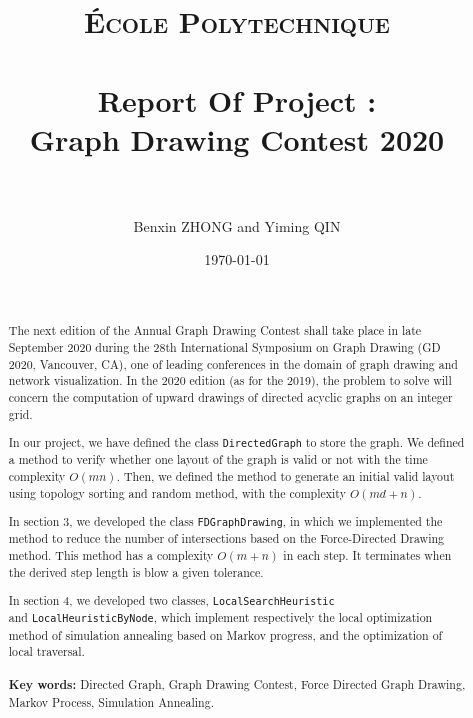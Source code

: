 \documentclass[paper=a4, fontsize=12pt, french]{scrartcl} %
\title{	
\normalfont \normalsize 
\textsc{École Polytechnique} \\ [25pt] %
\horrule{0.5pt} \\[0.4cm] %
\huge  Report Of Project : \\
\huge  Graph Drawing Contest 2020\\ %
\horrule{2pt} \\[0.5cm] %
}
\author{Benxin ZHONG and Yiming QIN} %
\date{\normalsize\today} %
\numberwithin{equation}{section} %
\numberwithin{figure}{section} %
\numberwithin{table}{section} %
\begin{document}
\maketitle %
\thispagestyle{empty}

\newpage
\begin{abstract}
\thispagestyle{empty}
{ }
\\
\newline


The next edition of the Annual Graph Drawing Contest shall take place in late September 2020 during the 28th International Symposium on Graph Drawing (GD 2020, Vancouver, CA), one of leading conferences in the domain of graph drawing and network visualization.
In the 2020 edition (as for the 2019), the problem to solve will concern the computation of upward drawings of directed acyclic graphs on an integer grid.

In our project, we have defined the class \lstinline{DirectedGraph} to store the graph.
We defined a method to verify whether one layout of the graph is valid or not with the time complexity $O(mn)$. Then, we defined the method to generate an initial valid layout using topology sorting and random method, with the complexity $O(md + n)$. 

In section 3, we developed the class \lstinline{FDGraphDrawing}, in which we implemented the method to reduce the number of intersections based on the Force-Directed Drawing method. This method has a complexity $O(m+n)$ in each step. It terminates when the derived step length is blow a given tolerance. 

In section 4, we developed two classes, \lstinline{LocalSearchHeuristic} \\
and \lstinline{LocalHeuristicByNode}, which implement respectively the local optimization method of simulation annealing based on Markov progress, and the optimization of local traversal. 
\\
\\
\textbf{Key words:} Directed Graph, Graph Drawing Contest, Force Directed Graph Drawing, Markov Process, Simulation Annealing.
    
\end{abstract}

\newpage
\tableofcontents
\thispagestyle{empty}
\newpage
\clearpage
\setcounter{page}{1}












\newpage


\end{document}
